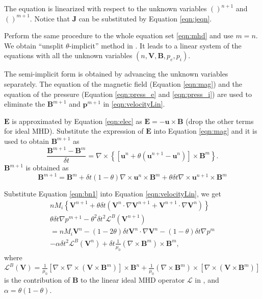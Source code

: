 \documentclass[11pt]{article}  %
\begin{document}
The equation is linearized with respect to the unknown  variables $()^{n+1}$ and $()^{m+1}$. Notice that $\mathbf{J}$ can be substituted by Equation \ref{eqn:jeqn}.

Perform the same procedure to the whole equation set \ref{eqn:mhd} and use $m=n$. We obtain ``unsplit $\theta$-implicit'' method in \cite{ferraro2009calculations}. It leads to a linear system of the equations with all the unknown variables $(n, \mathbf{V}, \mathbf{B}, p_e, p_i)$. 

The semi-implicit form is obtained by advancing the unknown variables separately.  The equation of the magnetic field (Equation \ref{eqn:mag}) and the equation of the pressure (Equation \ref{eqn:press_e} and \ref{eqn:press_i}) are used to eliminate the $\mathbf{B}^{m+1}$ and $\mathbf{p}^{m+1}$ in \ref{eqn:velocityLin}.

$\mathbf{E}$ is approximated by Equation \ref{eqn:elec} as $\mathbf{E}=-\mathbf{u}\times \mathbf{B}$ (drop the other terms for ideal MHD). Substitute the expression of $\mathbf{E}$ into Equation \ref{eqn:mag} and it is used to obtain $\mathbf{B}^{m+1}$ as
\begin{equation}
\frac{\mathbf{B}^{m+1}-\mathbf{B}^m}{\delta t} = \nabla \times \left\{\left[\mathbf{u}^{n}+ \theta (\mathbf{u}^{n+1}-\mathbf{u}^n)\right] \times \mathbf{B}^m \right\}.
\end{equation}
$\mathbf{B}^{m+1}$ is obtained as
\begin{equation}
\mathbf{B}^{m+1}=\mathbf{B}^m+ \delta t (1-\theta) \nabla \times \mathbf{u}^{n}  \times \mathbf{B}^m + \theta \delta t  \nabla \times \mathbf{u}^{n+1}  \times \mathbf{B}^m \label{eqn:bn1} 
\end{equation}

Substitute Equation \ref{eqn:bn1} into Equation \ref{eqn:velocityLin}, we get
\begin{eqnarray}
nM_i \left\{ \mathbf{V}^{n+1}   +\theta \delta t  (\mathbf{V}^n \cdot \nabla \mathbf{V}^{n+1} + \mathbf{V}^{n+1} \cdot\nabla \mathbf{V}^{n})  \right\}     \nonumber \\
  \theta \delta t  \nabla p^{m+1} -  \theta^2 \delta t^2 \mathcal{L}^{B}(\mathbf{V}^{n+1})   \nonumber \\
      = nM_i  \mathbf{V}^{n}  - (1-2 \theta) \delta t  \mathbf{V}^n \cdot \nabla \mathbf{V}^{n}
 -(1-\theta) \delta t  \nabla p^{m}   \nonumber \\
 -\alpha \delta t^2 \mathcal{L}^{B}(\mathbf{V}^{n})  + \delta t   \frac{1}{\mu_0}(\nabla \times \mathbf{B}^m)  \times \mathbf{B}^m, \label{eqn:velocityLinSplit}
\end{eqnarray}
where $ \mathcal{L}^{B} (\mathbf{V})= \frac{1}{\mu_0}[\nabla \times \nabla \times (\mathbf{V} \times \mathbf{B}^{m})]\times \mathbf{B}^n +  \frac{1}{\mu_0} (\nabla \times \mathbf{B}^m) \times [\nabla \times (\mathbf{V} \times \mathbf{B}^{m})] $ is the contribution of $\mathbf{B}$ to the linear ideal MHD operator  $\mathcal{L}$ in \cite{ferraro2009calculations},  and $\alpha =\theta(1-\theta)$.
\end{document}

